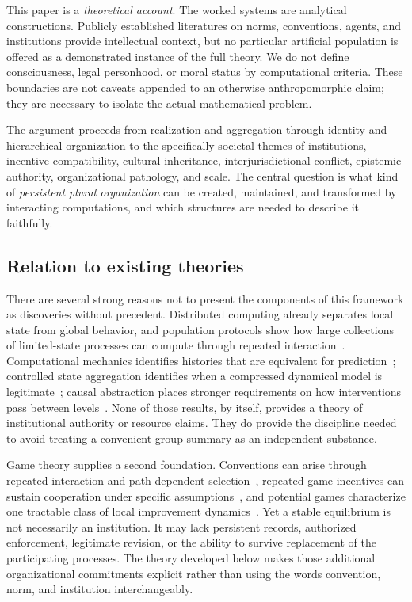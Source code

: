 \documentclass[11pt,letterpaper]{article}
\theoremstyle{plain}
\theoremstyle{definition}
\theoremstyle{remark}
\begin{document}
This paper is a \emph{theoretical account}. The worked systems are analytical constructions. Publicly established literatures on norms, conventions, agents, and institutions provide intellectual context, but no particular artificial population is offered as a demonstrated instance of the full theory. We do not define consciousness, legal personhood, or moral status by computational criteria. These boundaries are not caveats appended to an otherwise anthropomorphic claim; they are necessary to isolate the actual mathematical problem.

The argument proceeds from realization and aggregation through identity and hierarchical organization to the specifically societal themes of institutions, incentive compatibility, cultural inheritance, interjurisdictional conflict, epistemic authority, organizational pathology, and scale. The central question is what kind of \emph{persistent plural organization} can be created, maintained, and transformed by interacting computations, and which structures are needed to describe it faithfully.

\subsection{Relation to existing theories}

There are several strong reasons not to present the components of this framework as discoveries without precedent. Distributed computing already separates local state from global behavior, and population protocols show how large collections of limited-state processes can compute through repeated interaction~\cite{angluin}. Computational mechanics identifies histories that are equivalent for prediction~\cite{shalizi}; controlled state aggregation identifies when a compressed dynamical model is legitimate~\cite{givan}; causal abstraction places stronger requirements on how interventions pass between levels~\cite{rubenstein,beckers,rischel}. None of those results, by itself, provides a theory of institutional authority or resource claims. They do provide the discipline needed to avoid treating a convenient group summary as an independent substance.

Game theory supplies a second foundation. Conventions can arise through repeated interaction and path-dependent selection~\cite{young,shoham}, repeated-game incentives can sustain cooperation under specific assumptions~\cite{fudenbergmaskin}, and potential games characterize one tractable class of local improvement dynamics~\cite{monderer}. Yet a stable equilibrium is not necessarily an institution. It may lack persistent records, authorized enforcement, legitimate revision, or the ability to survive replacement of the participating processes. The theory developed below makes those additional organizational commitments explicit rather than using the words convention, norm, and institution interchangeably.
\end{document}

